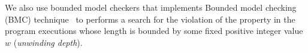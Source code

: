 We also use bounded model checkers that implements Bounded model checking (BMC) technique~\cite{biere1999symbolic1, biere2003bounded} to performs a search for the violation of the property in the program executions whose length is bounded by some fixed positive integer value $w$ (\textit{unwinding depth}). 
%
%

